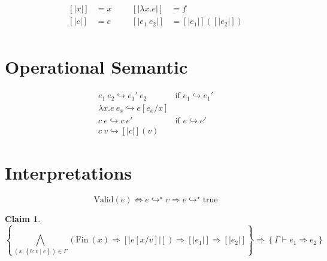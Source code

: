 \documentclass[10pt,a4paper]{article}
\newtheorem{claim}{Claim}
\newcommand\efun[2]{\ensuremath{\lambda #1 . #2}}
\newcommand\eapp[2]{\ensuremath{#1 \ #2}}
\newcommand\etrue{\ensuremath{\text{true}}}
\newcommand\tref[3]{\ensuremath{\left\lbrace #1 \colon #2 \mid #3 \right\rbrace}}
\newcommand\fin[1]{\ensuremath{\text{Fin}\ (#1)}}
\newcommand\valid[1]{\ensuremath{\text{Valid}(#1)}}
\newcommand\sub[2]{\ensuremath{\left[ #2 / #1 \right]}}
\newcommand\interp[1]{\ensuremath{[|#1|]}}
\newcommand\eval[2]{\ensuremath{#1 \hookrightarrow #2}}
\newcommand\evals[2]{\ensuremath{#1 \hookrightarrow^\star #2}}
\newcommand\issubref[3]{\ensuremath{#1 \vdash #2 \Rightarrow #3}}
\begin{document}
\begin{align*}
\interp{x}&=x &&&
\interp{\efun{x}{e}}&=f\\
\interp{c}&=c &&&
\interp{\eapp{e_1}{e_2}}&=\interp{e_1}(\interp{e_2})\\
\end{align*}


\section*{Operational Semantic}

$$
\begin{array}{ll}
\eval{\eapp{e_1}{e_2}}{\eapp{e_1'}{e_2}} & \text{if } \eval{e_1}{e_1'}\\
\eval{\eapp{\efun{x}{e}}{e_x}}{e\sub{x}{e_x}} &\\
\eval{\eapp{c}{e}}{\eapp{c}{e'}} & \text{if } \eval{e}{e'}\\
\eval{\eapp{c}{v}}{[|c|](v)}
\end{array}
$$

\section*{Interpretations}
$$\valid{e} \Leftrightarrow \evals{e}{v}\Rightarrow\evals{e}{\etrue}$$


\begin{claim}
$$
\left\lbrace	
	\bigwedge_{(x,\tref{b}{v}{e})\in\Gamma}(\fin{x}\Rightarrow \interp{e\sub{v}{x}})
	\Rightarrow \interp{e_1}
	\Rightarrow \interp{e_2}
\right\rbrace
\Rightarrow
\left\lbrace	
\issubref{\Gamma}{e_1}{e_2}
\right\rbrace
$$
\end{claim}
\end{document}
